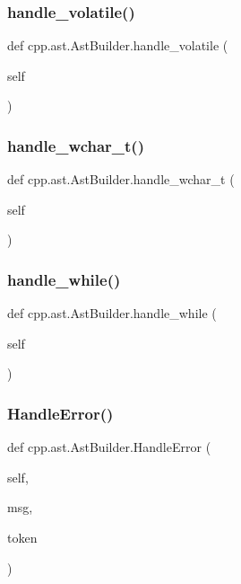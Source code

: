 \subsubsection{\texorpdfstring{handle\_volatile()}{handle\_volatile()}}
{\footnotesize\ttfamily def cpp.\+ast.\+Ast\+Builder.\+handle\+\_\+volatile (\begin{DoxyParamCaption}\item[{}]{self }\end{DoxyParamCaption})}

\mbox{\label{classcpp_1_1ast_1_1AstBuilder_a4ec65909aea14f45709733d631aed57b}} 
\subsubsection{\texorpdfstring{handle\_wchar\_t()}{handle\_wchar\_t()}}
{\footnotesize\ttfamily def cpp.\+ast.\+Ast\+Builder.\+handle\+\_\+wchar\+\_\+t (\begin{DoxyParamCaption}\item[{}]{self }\end{DoxyParamCaption})}

\mbox{\label{classcpp_1_1ast_1_1AstBuilder_aac812e812ba2e5fbd80dde93be01a414}} 
\subsubsection{\texorpdfstring{handle\_while()}{handle\_while()}}
{\footnotesize\ttfamily def cpp.\+ast.\+Ast\+Builder.\+handle\+\_\+while (\begin{DoxyParamCaption}\item[{}]{self }\end{DoxyParamCaption})}

\mbox{\label{classcpp_1_1ast_1_1AstBuilder_a3e610662018d674f6c57ef19254cc470}} 
\subsubsection{\texorpdfstring{HandleError()}{HandleError()}}
{\footnotesize\ttfamily def cpp.\+ast.\+Ast\+Builder.\+Handle\+Error (\begin{DoxyParamCaption}\item[{}]{self,  }\item[{}]{msg,  }\item[{}]{token }\end{DoxyParamCaption})}



